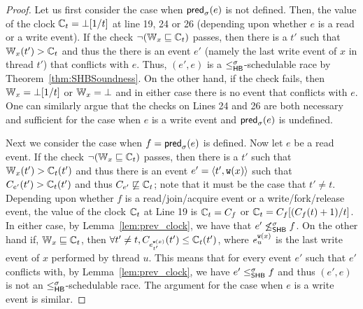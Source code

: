 \begin{proof}
% 
Let us first consider the case when $\mathsf{pred}_{\sigma}(e)$ is not defined.
Then, the value of the clock $\mathbb{C}_t = \bot[1/t]$ at line 19, 24 or 26 (depending
upon whether $e$ is a read or a write event).
If the check $\neg(\mathbb{W}_x \sqsubseteq \mathbb{C}_t)$ passes, then
there is a $t'$ such that $\mathbb{W}_x(t') > \mathbb{C}_t$ and thus
the there is an event $e'$ (namely the last write event of $x$ in thread $t'$)
that conflicts with $e$. Thus, $(e', e)$ is a $\leq^{\sigma}_{\mathsf{HB}}$-schedulable race
by Theorem~\ref{thm:SHBSoundness}.
On the other hand, if the check fails, then
$\mathbb{W}_x = \bot[1/t]$ or $\mathbb{W}_x = \bot$ and in either case
there is no event that conflicts with $e$.
One can similarly argue that the checks on Lines 24 and 26
are both necessary and sufficient for the case when $e$ is a write event
and $\mathsf{pred}_{\sigma}(e)$ is undefined.

Next we consider the case when $f = \mathsf{pred}_{\sigma}(e)$ is defined.  Now
let $e$ be a read event.  If the check $\neg(\mathbb{W}_x \sqsubseteq \mathbb{C}_t)$
passes, then there is a $t'$ such that $\mathbb{W}_x(t') > \mathbb{C}_t(t')$ and
thus there is an event $e' = \langle t', \mathtt{w}(x)\rangle$ such that $C_{e'}(t')
> \mathbb{C}_t(t')$ and thus $C_{e'} \not\sqsubseteq \mathbb{C}_t$; note that it must be
the case that $t' \neq t$.  Depending upon whether $f$ is a
read/join/acquire event or a write/fork/release event, the value of
the clock $\mathbb{C}_t$ at Line 19 is $\mathbb{C}_t = C_f$ or $\mathbb{C}_t =
C_f[(C_f(t)+1)/t]$.  In either case, by Lemma~\ref{lem:prev_clock}, we
have that $e' \not\leq_\textsf{SHB}^\sigma f$.  On the other hand if,
$\mathbb{W}_x \sqsubseteq \mathbb{C}_t$, then $\forall t' \neq t,
C_{e_{t'}^{\mathtt{w}(x)}}(t') \leq \mathbb{C}_t(t')$, where $e_{u}^{\mathtt{w}(x)}$ is the
last write event of $x$ performed by thread $u$.  This means that for
every event $e'$ such that $e'$ conflicts with, by
Lemma~\ref{lem:prev_clock}, we have $e' \leq^{\sigma}_{\mathsf{SHB}} f$ and thus $(e',
e)$ is not an $\leq^{\sigma}_{\mathsf{HB}}$-schedulable race.  The argument for the case
when $e$ is a write event is similar.
\end{proof}

